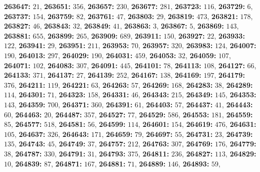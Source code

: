 \textsf{\bfseries 263647:} $21$, \textsf{\bfseries 263651:} $356$, \textsf{\bfseries 263657:} $230$, \textsf{\bfseries 263677:} $281$, \textsf{\bfseries 263723:} $116$, \textsf{\bfseries 263729:} $6$, \textsf{\bfseries 263737:} $154$, \textsf{\bfseries 263759:} $82$, \textsf{\bfseries 263761:} $47$, \textsf{\bfseries 263803:} $29$, \textsf{\bfseries 263819:} $473$, \textsf{\bfseries 263821:} $178$, \textsf{\bfseries 263827:} $46$, \textsf{\bfseries 263843:} $32$, \textsf{\bfseries 263849:} $41$, \textsf{\bfseries 263863:} $3$, \textsf{\bfseries 263867:} $5$, \textsf{\bfseries 263869:} $143$, \textsf{\bfseries 263881:} $655$, \textsf{\bfseries 263899:} $265$, \textsf{\bfseries 263909:} $689$, \textsf{\bfseries 263911:} $150$, \textsf{\bfseries 263927:} $22$, \textsf{\bfseries 263933:} $122$, \textsf{\bfseries 263941:} $29$, \textsf{\bfseries 263951:} $211$, \textsf{\bfseries 263953:} $70$, \textsf{\bfseries 263957:} $320$, \textsf{\bfseries 263983:} $124$, \textsf{\bfseries 264007:} $190$, \textsf{\bfseries 264013:} $297$, \textsf{\bfseries 264029:} $190$, \textsf{\bfseries 264031:} $459$, \textsf{\bfseries 264053:} $32$, \textsf{\bfseries 264059:} $107$, \textsf{\bfseries 264071:} $102$, \textsf{\bfseries 264083:} $307$, \textsf{\bfseries 264091:} $445$, \textsf{\bfseries 264101:} $78$, \textsf{\bfseries 264113:} $108$, \textsf{\bfseries 264127:} $66$, \textsf{\bfseries 264133:} $371$, \textsf{\bfseries 264137:} $27$, \textsf{\bfseries 264139:} $252$, \textsf{\bfseries 264167:} $138$, \textsf{\bfseries 264169:} $197$, \textsf{\bfseries 264179:} $376$, \textsf{\bfseries 264211:} $119$, \textsf{\bfseries 264221:} $63$, \textsf{\bfseries 264263:} $57$, \textsf{\bfseries 264269:} $168$, \textsf{\bfseries 264283:} $38$, \textsf{\bfseries 264289:} $114$, \textsf{\bfseries 264301:} $71$, \textsf{\bfseries 264323:} $158$, \textsf{\bfseries 264331:} $46$, \textsf{\bfseries 264343:} $215$, \textsf{\bfseries 264349:} $145$, \textsf{\bfseries 264353:} $143$, \textsf{\bfseries 264359:} $700$, \textsf{\bfseries 264371:} $360$, \textsf{\bfseries 264391:} $61$, \textsf{\bfseries 264403:} $57$, \textsf{\bfseries 264437:} $41$, \textsf{\bfseries 264443:} $60$, \textsf{\bfseries 264463:} $20$, \textsf{\bfseries 264487:} $357$, \textsf{\bfseries 264527:} $77$, \textsf{\bfseries 264529:} $586$, \textsf{\bfseries 264553:} $181$, \textsf{\bfseries 264559:} $85$, \textsf{\bfseries 264577:} $518$, \textsf{\bfseries 264581:} $56$, \textsf{\bfseries 264599:} $114$, \textsf{\bfseries 264601:} $154$, \textsf{\bfseries 264619:} $476$, \textsf{\bfseries 264631:} $105$, \textsf{\bfseries 264637:} $326$, \textsf{\bfseries 264643:} $171$, \textsf{\bfseries 264659:} $79$, \textsf{\bfseries 264697:} $55$, \textsf{\bfseries 264731:} $23$, \textsf{\bfseries 264739:} $135$, \textsf{\bfseries 264743:} $45$, \textsf{\bfseries 264749:} $37$, \textsf{\bfseries 264757:} $212$, \textsf{\bfseries 264763:} $307$, \textsf{\bfseries 264769:} $176$, \textsf{\bfseries 264779:} $38$, \textsf{\bfseries 264787:} $330$, \textsf{\bfseries 264791:} $31$, \textsf{\bfseries 264793:} $375$, \textsf{\bfseries 264811:} $236$, \textsf{\bfseries 264827:} $113$, \textsf{\bfseries 264829:} $10$, \textsf{\bfseries 264839:} $87$, \textsf{\bfseries 264871:} $167$, \textsf{\bfseries 264881:} $71$, \textsf{\bfseries 264889:} $146$, \textsf{\bfseries 264893:} $59$, 
